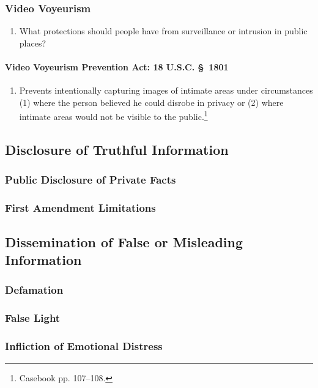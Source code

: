 \subsubsection{Video Voyeurism}

\begin{enumerate}
    \item What protections should people have from surveillance or intrusion in 
    public places?
\end{enumerate}

\paragraph{Video Voyeurism Prevention Act: 18 U.S.C. \S\ 1801}

\begin{enumerate}
    \item Prevents intentionally capturing images of intimate areas under 
    circumstances (1) where the person believed he could disrobe in privacy or 
    (2) where intimate areas would not be visible to the 
    public.\footnote{Casebook pp. 107--108.}
\end{enumerate}

\subsection{Disclosure of Truthful Information}

\subsubsection{Public Disclosure of Private Facts}


\subsubsection{First Amendment Limitations}


\subsection{Dissemination of False or Misleading Information}

\subsubsection{Defamation}


\subsubsection{False Light}


\subsubsection{Infliction of Emotional Distress}

